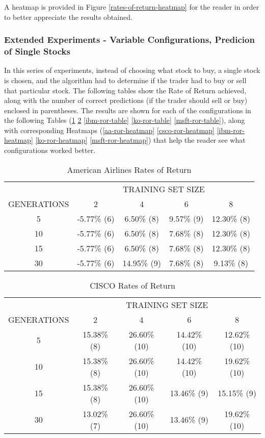 A heatmap is provided in Figure \ref{rates-of-return-heatmap} for the reader in order to better appreciate the results obtained.

\subsubsection{Extended Experiments - Variable Configurations, Predicion of Single Stocks}

In this series of experiments, instead of choosing what stock to buy, a single stock is chosen, and the algorithm had to determine if the trader had to buy or sell that particular stock. The following tables show the Rate of Return achieved, along with the number of correct predictions (if the trader should sell or buy) enclosed in parentheses. The results are shown for each of the configurations in the following Tables (\ref{aa-ror-table} \ref{csco-ror-table} \ref{ibm-ror-table} \ref{ko-ror-table} \ref{msft-ror-table}), along with corresponding Heatmaps (\ref{aa-ror-heatmap} \ref{csco-ror-heatmap} \ref{ibm-ror-heatmap} \ref{ko-ror-heatmap} \ref{msft-ror-heatmap}) that help the reader see what configurations worked better.

\begin{table}
\caption{American Airlines Rates of Return}
\label{aa-ror-table}
    \begin{tabular}{ c c c c c }
         & \multicolumn{4}{c}{TRAINING SET SIZE} \\ 
        GENERATIONS & 2           & 4           & 6          & 8           \\ 
        5           & -5.77\% (6) & 6.50\% (8)  & 9.57\% (9) & 12.30\% (8) \\ 
        10          & -5.77\% (6) & 6.50\% (8)  & 7.68\% (8) & 12.30\% (8) \\ 
        15          & -5.77\% (6) & 6.50\% (8)  & 7.68\% (8) & 12.30\% (8) \\ 
        30          & -5.77\% (6) & 14.95\% (9) & 7.68\% (8) & 9.13\% (8)  \\ 
    \end{tabular} 
\end{table}
  
\begin{table}
\caption{CISCO Rates of Return}
\label{csco-ror-table}
    \begin{tabular}{ c c c c c }
         & \multicolumn{4}{c}{TRAINING SET SIZE} \\ 
        GENERATIONS & 2           & 4           & 6             & 8           \\ 
        5           & 15.38\% (8) & 26.60\% (10) & 14.42\% (10) & 12.62\% (10) \\ 
        10          & 15.38\% (8) & 26.60\% (10) & 14.42\% (10) & 19.62\% (10) \\ 
        15          & 15.38\% (8) & 26.60\% (10) & 13.46\% (9)  & 15.15\% (9) \\ 
        30          & 13.02\% (7) & 26.60\% (10) & 13.46\% (9)  & 19.62\% (10)  \\ 
    \end{tabular} 
\end{table}

